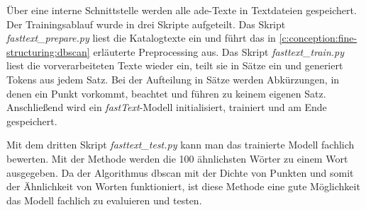Über eine interne Schnittstelle werden alle \ac{ade}-Texte in Textdateien gespeichert. Der Trainingsablauf wurde in drei Skripte aufgeteilt. Das Skript \textit{fasttext\_prepare.py} liest die Katalogtexte ein und führt das in \autoref{c:conception:fine-structuring:dbscan} erläuterte Preprocessing aus.
Das Skript \textit{fasttext\_train.py} liest die vorverarbeiteten Texte wieder ein, teilt sie in Sätze ein und generiert Tokens aus jedem Satz. Bei der Aufteilung in Sätze werden Abkürzungen, in denen ein Punkt vorkommt, beachtet und führen zu keinem eigenen Satz. Anschließend wird ein \textit{fastText}-Modell initialisiert, trainiert und am Ende gespeichert.

Mit dem dritten Skript \textit{fasttext\_test.py} kann man das trainierte Modell fachlich bewerten. Mit der Methode  werden die 100 ähnlichsten Wörter zu einem Wort ausgegeben. Da der Algorithmus \ac{dbscan} mit der Dichte von Punkten und somit der \glqq Ähnlichkeit\grqq{} von Worten funktioniert, ist diese Methode eine gute Möglichkeit das Modell fachlich zu evaluieren und testen.

